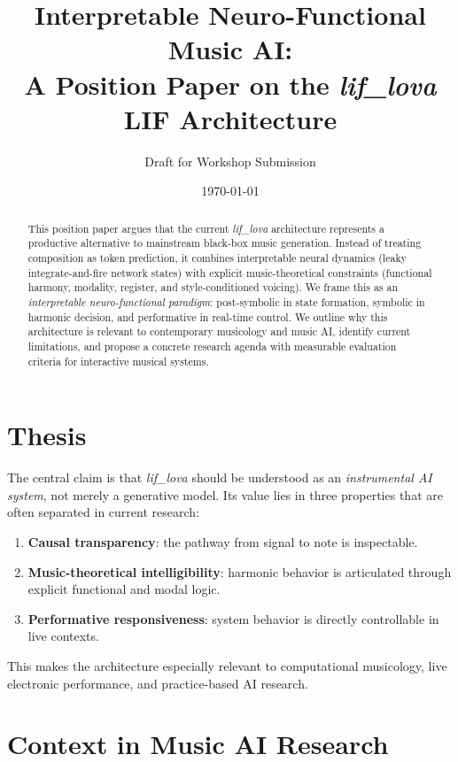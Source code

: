 \documentclass[11pt,a4paper]{article}
\title{Interpretable Neuro-Functional Music AI:\\
\large A Position Paper on the \textit{lif\_lova} LIF Architecture}
\author{Draft for Workshop Submission}
\date{\today}
\begin{document}
\maketitle
\onehalfspacing

\begin{abstract}
This position paper argues that the current \textit{lif\_lova} architecture represents a productive
alternative to mainstream black-box music generation. Instead of treating composition as token
prediction, it combines interpretable neural dynamics (leaky integrate-and-fire network states)
with explicit music-theoretical constraints (functional harmony, modality, register, and style-conditioned
voicing). We frame this as an \emph{interpretable neuro-functional paradigm}: post-symbolic in state formation,
symbolic in harmonic decision, and performative in real-time control. We outline why this architecture is
relevant to contemporary musicology and music AI, identify current limitations, and propose a concrete
research agenda with measurable evaluation criteria for interactive musical systems.
\end{abstract}

\section{Thesis}

The central claim is that \textit{lif\_lova} should be understood as an \emph{instrumental AI system},
not merely a generative model. Its value lies in three properties that are often separated in current research:
\begin{enumerate}[label=\arabic*.]
    \item \textbf{Causal transparency}: the pathway from signal to note is inspectable.
    \item \textbf{Music-theoretical intelligibility}: harmonic behavior is articulated through explicit functional and modal logic.
    \item \textbf{Performative responsiveness}: system behavior is directly controllable in live contexts.
\end{enumerate}

This makes the architecture especially relevant to computational musicology, live electronic performance,
and practice-based AI research.

\section{Context in Music AI Research}
\end{document}
